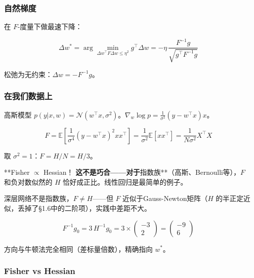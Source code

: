 \documentclass[12pt,a4paper]{article}
\begin{document}
\subsubsection{自然梯度}

在 $F$-度量下做最速下降：


\[\Delta w^* = \arg\min_{\Delta w^\top F \Delta w \le \eta^2} g^\top \Delta w = -\eta\,\frac{F^{-1}g}{\sqrt{g^\top F^{-1}g}}\]

松弛为无约束：$\Delta w = -F^{-1}g$。


\subsubsection{在我们数据上}

高斯模型 $p(y|x,w) = \mathcal{N}(w^\top x, \sigma^2)$。$\nabla_w \log p = \frac{1}{\sigma^2}(y - w^\top x)x$。


\[F = \mathbb{E}\left[\frac{1}{\sigma^4}(y-w^\top x)^2 xx^\top\right] = \frac{1}{\sigma^2}\mathbb{E}[xx^\top] = \frac{1}{N\sigma^2}X^\top X\]

取 $\sigma^2 = 1$：$F = H/N = H/3$。

**Fisher $\propto$ Hessian！\textbf{ 这不是巧合——对于}指数族**（高斯、Bernoulli等），$F$ 和负对数似然的 $H$ 恰好成正比。线性回归是最简单的例子。

深层网络不是指数族，$F \neq H$——但 $F$ 近似于Gauss-Newton矩阵（$H$ 的半正定近似，丢掉了§1.6中的二阶项），实践中差距不大。


\[F^{-1}g_0 = 3\,H^{-1}g_0 = 3 \times \begin{pmatrix}-3\\2\end{pmatrix} = \begin{pmatrix}-9\\6\end{pmatrix}\]

方向与牛顿法完全相同（差标量倍数），精确指向 $w^*$。


\subsubsection{Fisher vs Hessian}
\end{document}
